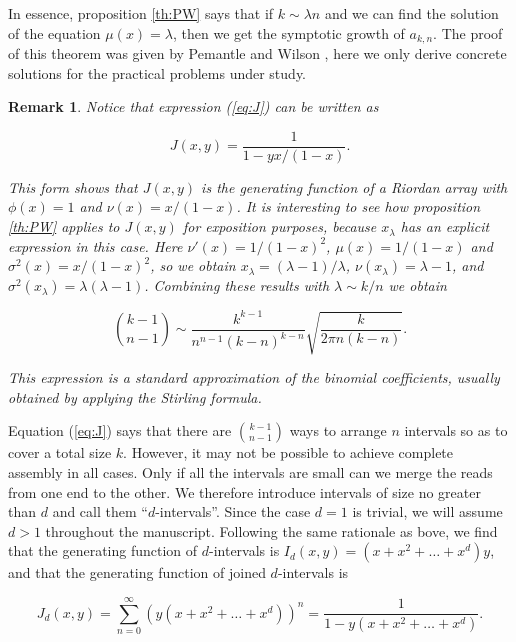 \documentclass{article}
\newtheorem*{remark}{Remark}
\begin{document}
In essence, proposition \ref{th:PW} says that if $k \sim \lambda n$ and we
can find the solution of the equation $\mu(x) = \lambda$, then we get the
symptotic growth of $a_{k,n}$. The proof of this theorem was given by
Pemantle and Wilson \cite{PemWil08,AnalComb2013}, here we only derive
concrete solutions for the practical problems under study.

\begin{remark}
Notice that expression (\ref{eq:J}) can be written as

\begin{equation*}
J(x,y) = \frac{1}{1 - yx/(1-x)}.
\end{equation*}

This form shows that $J(x,y)$ is the generating function of a Riordan
array with $\phi(x) = 1$ and $\nu(x) = x/(1-x)$. It is interesting to see
how proposition \ref{th:PW} applies to $J(x,y)$ for exposition purposes,
because $x_\lambda$ has an explicit expression in this case. Here $\nu'(x)
= 1/(1-x)^2$, $\mu(x) = 1/(1-x)$ and $\sigma^2(x) = x/(1-x)^2$, so we
obtain $x_\lambda = (\lambda -1)/\lambda$, $\nu(x_\lambda) = \lambda -1$,
and $\sigma^2(x_\lambda) = \lambda(\lambda-1)$. Combining these results
with $\lambda \sim k/n$ we obtain

\begin{equation*}
{k-1 \choose n-1} \sim \frac{k^{k-1}}{n^{n-1}(k-n)^{k-n}}
\sqrt{\frac{k}{2\pi n(k-n)}}.
\end{equation*}

This expression is a standard approximation of the binomial coefficients,
usually obtained by applying the Stirling formula.
\end{remark}
Equation (\ref{eq:J}) says that there are ${k-1 \choose n-1}$ ways to
arrange $n$ intervals so as to cover a total size $k$. However, it may not
be possible to achieve complete assembly in all cases. Only if all the
intervals are small can we merge the reads from one end to the other.  We
therefore introduce intervals of size no greater than $d$ and call them
``$d$-intervals''. Since the case $d=1$ is trivial, we will assume $d > 1$
throughout the manuscript.  Following the same rationale as bove, we find
that the generating function of $d$-intervals is $I_d(x,y) =
(x+x^2+\ldots+x^d)y$, and that the generating function of joined
$d$-intervals is

\begin{equation}
\label{eq:Jd}
J_d(x,y) = \sum_{n=0}^\infty \left(y(x+x^2+\ldots+x^d)\right)^n =
\frac{1}{1-y(x+x^2+\ldots+x^d)}.
\end{equation}
\end{document}
